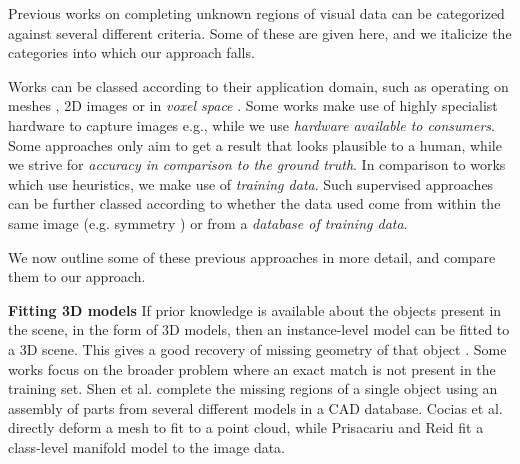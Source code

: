 \documentclass[10pt,twocolumn,letterpaper]{article}
\makeatletter
\renewcommand*{\eg}{e.g.\@\xspace}
\newcommand*{\ea}{et al.\@\xspace}
\renewcommand{\paragraph}{\vspace{2pt}\noindent\textbf}
\makeatother
\begin{document}


Previous works on completing unknown regions of visual data can be categorized against several different criteria.
Some of these are given here, and we italicize the categories into which our approach falls.

Works can be classed according to their application domain, such as operating on meshes \cite{harary-tog-2013, schnabel-eurographics-2009}, 2D images \cite{gupta-cvpr-2011} or in \emph{voxel space} \cite{kim-iccv-2013}.
Some works make use of highly specialist hardware to capture images \eg \cite{velten-nature-2012}, while we use \emph{hardware available to consumers}.
Some approaches only aim to get a result that looks plausible to a human, while we strive for \emph{accuracy in comparison to the ground truth}.
In comparison to works which use heuristics, we make use of \emph{training data}.
Such supervised approaches can be further classed according to whether the data used come from within the same image (\eg symmetry \cite{kroemer-humanoids-2012}) or from a \emph{database of training data}.

We now outline some of these previous approaches in more detail, and compare them to our approach.


\paragraph{Fitting 3D models}
If prior knowledge is available about the objects present in the scene, in the form of 3D models, then an instance-level model can be fitted to a 3D scene.
This gives a good recovery of missing geometry of that object \cite{hinterstoisser-accv-2012, drost-3dimpvt-2012}.
Some works focus on the broader problem where an exact match is not present in the training set.
Shen \ea \cite{shen-tog-2012} complete the missing regions of a single object using an assembly of parts from several different models in a CAD database.
Cocias \ea \cite{cocias-cgvcv-2013} directly deform a mesh to fit to a point cloud, while Prisacariu and Reid \cite{prisacariu-iccv-2011} fit a class-level manifold model to the image data.
\end{document}
